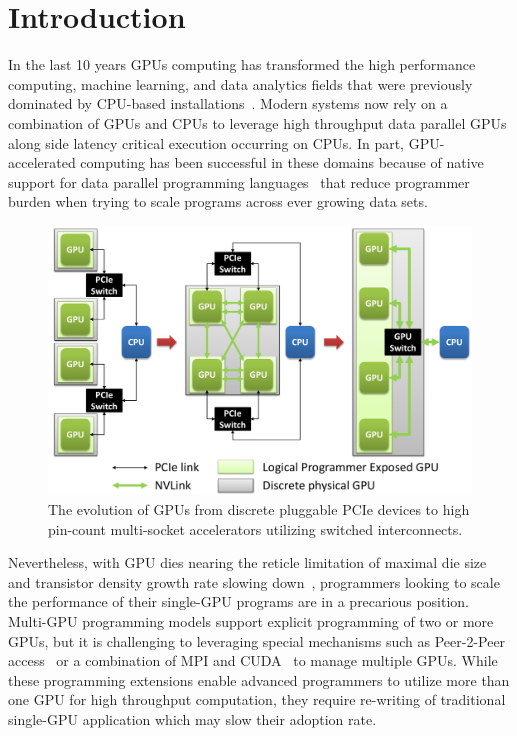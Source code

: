 \section{Introduction}
\label{introduction}

In the last 10 years GPUs computing has transformed the high performance 
computing, machine learning, and data analytics fields that were previously 
dominated by CPU-based 
installations~\cite{intersect360,cudnn,Lavin15b,SimonyanZ14a}. Modern systems 
now rely on a combination of GPUs and CPUs to leverage high throughput data 
parallel GPUs along side latency critical execution occurring on CPUs. In part, 
GPU-accelerated computing has been successful in these domains because of 
native 
support for data parallel programming languages~\cite{CUDA7,OPENCL} that reduce 
programmer burden when trying to scale programs across ever growing data sets.

\begin{figure}[t]
\centering
\includegraphics[width=1.0\columnwidth]{figures/inter_gpu_connections.pdf}
\caption{The evolution of GPUs from discrete pluggable PCIe devices to high 
pin-count 
multi-socket accelerators utilizing switched interconnects.}
\label{fig:systemdiagram}
\vspace{-.2in}
\end{figure}

Nevertheless, with GPU dies nearing the reticle limitation of maximal die size 
and transistor density growth rate slowing down~\cite{mooredead2016}, 
programmers looking to scale the performance of their single-GPU programs are 
in 
a precarious position. Multi-GPU programming models support explicit 
programming 
of two or more GPUs, but it is challenging to leveraging special mechanisms 
such 
as Peer-2-Peer access~\cite{NVIDIAP2P} or a combination of MPI and 
CUDA~\cite{NVIDIAMPI} to manage multiple GPUs. While these programming 
extensions enable advanced programmers to utilize more than one GPU for high 
throughput computation, they require re-writing of traditional single-GPU 
application which may slow their adoption rate.

